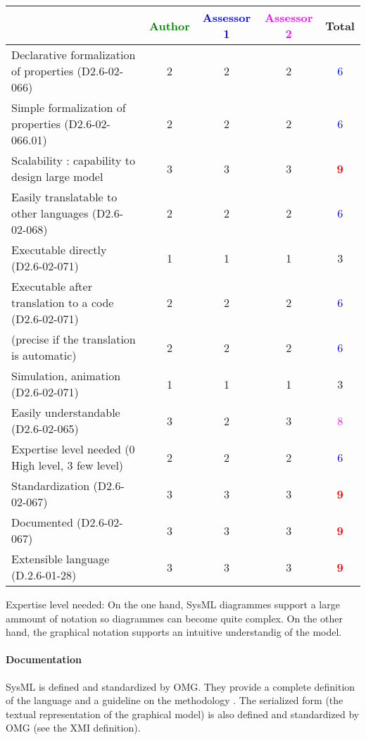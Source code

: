 \begin{tabular}{|l | c | c | c | c|}
\hline
& \textcolor{green}{Author} & \textcolor{blue}{Assessor 1} & \textcolor{magenta}{Assessor 2} & Total \\
\hline
Declarative formalization of properties (D2.6-02-066) & 2    & 2    & 2    & \textcolor{blue}{6} \\
\hline
Simple formalization of properties (D2.6-02-066.01) &2 &2 & 2   & \textcolor{blue}{6} \\
\hline
Scalability : capability to design large model &3 &3 &3 & \textcolor{red}{\textbf{9}} \\
\hline
Easily translatable to other languages (D2.6-02-068) &2 &2 & 2   & \textcolor{blue}{6} \\
\hline
Executable directly (D2.6-02-071) &1 & 1   & 1   & 3    \\
\hline
Executable after translation to a code (D2.6-02-071) & 2    & 2   & 2   & \textcolor{blue}{6} \\
(precise if the translation is automatic) &2 & 2   & 2   & \textcolor{blue}{6} \\
\hline
Simulation, animation (D2.6-02-071) &1 & 1   & 1   & 3    \\
\hline
Easily understandable (D2.6-02-065) &3 & 2   & 3   & \textcolor{magenta}{8} \\
\hline
Expertise level needed (0 High level, 3 few level) &2 &2 & 2   & \textcolor{blue}{6} \\
\hline
Standardization (D2.6-02-067) &3 & 3   & 3   & \textcolor{red}{\textbf{9}} \\
\hline
Documented (D2.6-02-067) &3 & 3   & 3   & \textcolor{red}{\textbf{9}} \\
\hline
Extensible language (D.2.6-01-28) &3 & 3   & 3   & \textcolor{red}{\textbf{9}} \\
\hline
\end{tabular}
\begin{assessor2}
Expertise level needed: On the one hand, SysML diagrammes support a large ammount of notation so diagrammes can become quite complex. On the other hand, the graphical notation supports an intuitive understandig of the model.
\end{assessor2}

\paragraph{Documentation} 
SysML is  defined and standardized by OMG. They provide a complete
definition of the language and a guideline on the methodology
\cite{SysML}. The serialized form (the textual representation of the
graphical model) is also defined and standardized by OMG (see the XMI
definition).

